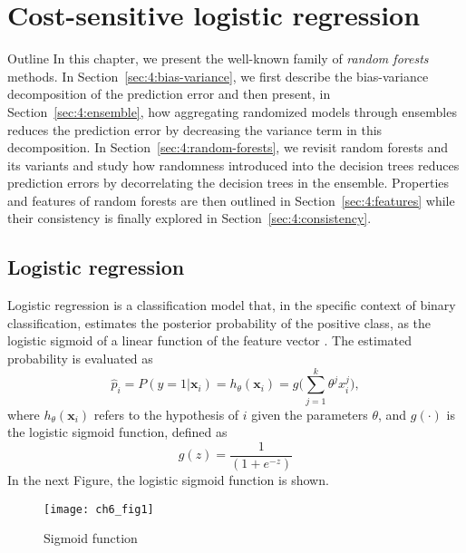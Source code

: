 \chapter{Cost-sensitive logistic regression}

\begin{remark}{Outline}
In this chapter, we present the well-known family of \textit{random forests}
methods. In Section~\ref{sec:4:bias-variance}, we first describe the bias-variance
decomposition of the prediction error and then present, in
Section~\ref{sec:4:ensemble}, how aggregating randomized models through
ensembles reduces the prediction error by decreasing the variance term in this
decomposition. In Section~\ref{sec:4:random-forests}, we revisit random forests
and its variants and study how randomness introduced into the decision trees
reduces prediction errors by decorrelating the decision
trees in the ensemble. Properties and features of random forests are then outlined
in Section~\ref{sec:4:features} while their consistency
is finally explored in Section~\ref{sec:4:consistency}.
\end{remark}

\section{Logistic regression}

Logistic regression is a classification model that, in the specific context of binary 
classification, estimates the posterior probability of the positive class, as the logistic sigmoid 
of a linear function of the feature vector \citep{Bishop2006}. The estimated probability  is 
evaluated as 
\begin{equation}
  \hat p_i = P(y=1 \vert \mathbf{x}_i) = h_{\theta}(\mathbf{x}_i) = 
  g\bigg(\sum_{j=1}^{k}{\theta^jx_i^j}\bigg),
\end{equation}
where $h_\theta(\mathbf{x}_i)$ refers to the hypothesis of $i$ given the parameters $\theta$,  
and  $g(\cdot)$ is the logistic sigmoid function, defined as
\begin{equation}
  g(z)=\frac{1}{(1+e^{-z})} 
\end{equation}
In the next Figure, the logistic sigmoid function is shown.
\begin{figure}[htbp]
  \centering
  \texttt{[image: ch6\_fig1]}
  \caption{Sigmoid function}
  \label{fig:ch6:1}
\end{figure}

